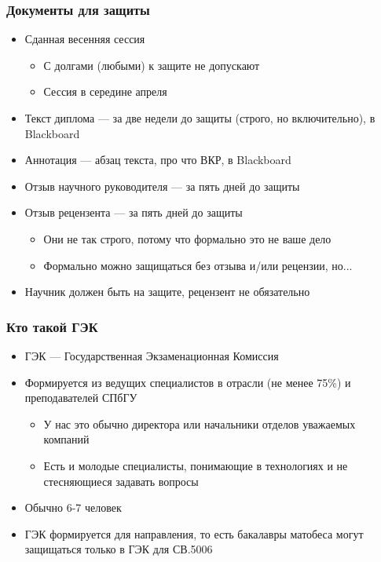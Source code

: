 \documentclass[xetex,mathserif,serif]{beamer}
\begin{document}
    \begin{frame}
        \frametitle{Документы для защиты}
        \begin{itemize}
            \item Сданная весенняя сессия
            \begin{itemize}
                \item С долгами (любыми) к защите не допускают
                \item Сессия в середине апреля
            \end{itemize}
            \item Текст диплома --- за две недели до защиты (строго, но включительно), в Blackboard
            \item Аннотация --- абзац текста, про что ВКР, в Blackboard
            \item Отзыв научного руководителя --- за пять дней до защиты
            \item Отзыв рецензента --- за пять дней до защиты
            \begin{itemize}
                \item Они не так строго, потому что формально это не ваше дело
                \item Формально можно защищаться без отзыва и/или рецензии, но...
            \end{itemize}
            \item Научник должен быть на защите, рецензент не обязательно
        \end{itemize}
    \end{frame}

    \begin{frame}
        \frametitle{Кто такой ГЭК}
        \begin{itemize}
            \item ГЭК --- Государственная Экзаменационная Комиссия
            \item Формируется из ведущих специалистов в отрасли (не менее 75\%) и преподавателей СПбГУ
            \begin{itemize}
                \item У нас это обычно директора или начальники отделов уважаемых компаний
                \item Есть и молодые специалисты, понимающие в технологиях и не стесняющиеся задавать вопросы
            \end{itemize}
            \item Обычно 6-7 человек
            \item ГЭК формируется для направления, то есть бакалавры матобеса могут защищаться только в ГЭК для СВ.5006
        \end{itemize}
    \end{frame}
\end{document}
